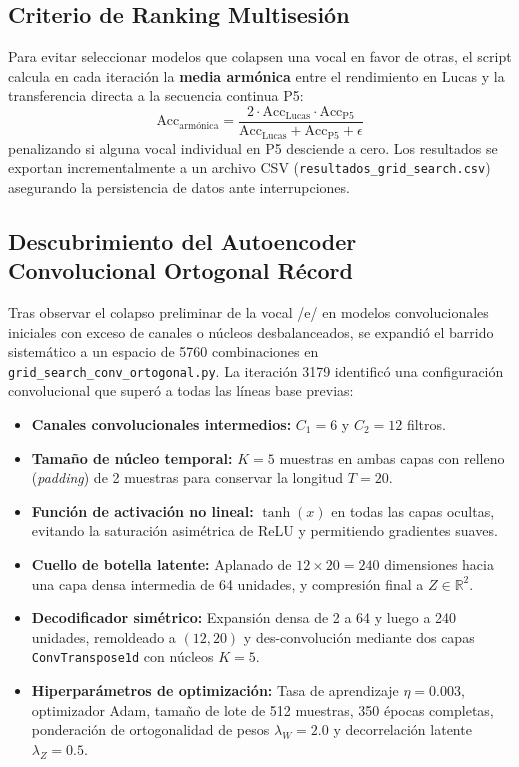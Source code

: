\documentclass[11pt,a4paper]{article}
\begin{document}
\subsection{Criterio de Ranking Multisesión}
\label{subsec:criterio_ranking}

Para evitar seleccionar modelos que colapsen una vocal en favor de otras, el script calcula en cada iteración la \textbf{media armónica} entre el rendimiento en Lucas y la transferencia directa a la secuencia continua P5:
\begin{equation}
    \text{Acc}_{\text{armónica}} = \frac{2 \cdot \text{Acc}_{\text{Lucas}} \cdot \text{Acc}_{\text{P5}}}{\text{Acc}_{\text{Lucas}} + \text{Acc}_{\text{P5}} + \epsilon}
\end{equation}
penalizando si alguna vocal individual en P5 desciende a cero. Los resultados se exportan incrementalmente a un archivo CSV (\texttt{resultados\_grid\_search.csv}) asegurando la persistencia de datos ante interrupciones.

\subsection{Descubrimiento del Autoencoder Convolucional Ortogonal Récord}
\label{subsec:conv_ortogonal_record}

Tras observar el colapso preliminar de la vocal /e/ en modelos convolucionales iniciales con exceso de canales o núcleos desbalanceados, se expandió el barrido sistemático a un espacio de 5760 combinaciones en \texttt{grid\_search\_conv\_ortogonal.py}. La iteración 3179 identificó una configuración convolucional que superó a todas las líneas base previas:

\begin{itemize}
    \item \textbf{Canales convolucionales intermedios:} $C_1 = 6$ y $C_2 = 12$ filtros.
    \item \textbf{Tamaño de núcleo temporal:} $K = 5$ muestras en ambas capas con relleno (\textit{padding}) de 2 muestras para conservar la longitud $T = 20$.
    \item \textbf{Función de activación no lineal:} $\tanh(x)$ en todas las capas ocultas, evitando la saturación asimétrica de ReLU y permitiendo gradientes suaves.
    \item \textbf{Cuello de botella latente:} Aplanado de $12 \times 20 = 240$ dimensiones hacia una capa densa intermedia de 64 unidades, y compresión final a $Z \in \mathbb{R}^2$.
    \item \textbf{Decodificador simétrico:} Expansión densa de 2 a 64 y luego a 240 unidades, remoldeado a $(12, 20)$ y des-convolución mediante dos capas \texttt{ConvTranspose1d} con núcleos $K = 5$.
    \item \textbf{Hiperparámetros de optimización:} Tasa de aprendizaje $\eta = 0.003$, optimizador Adam, tamaño de lote de 512 muestras, 350 épocas completas, ponderación de ortogonalidad de pesos $\lambda_W = 2.0$ y decorrelación latente $\lambda_Z = 0.5$.
\end{itemize}
\end{document}
